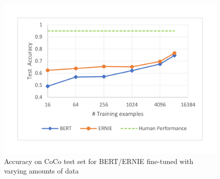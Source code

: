 \begin{figure}[h!]
	\centering
	\includegraphics[width=0.9\columnwidth]{images/learnCurveLine.pdf}
	\caption{Accuracy on CoCo test set for BERT/ERNIE fine-tuned with varying amounts of data}
	\label{fig:learnCurve}
\end{figure}

